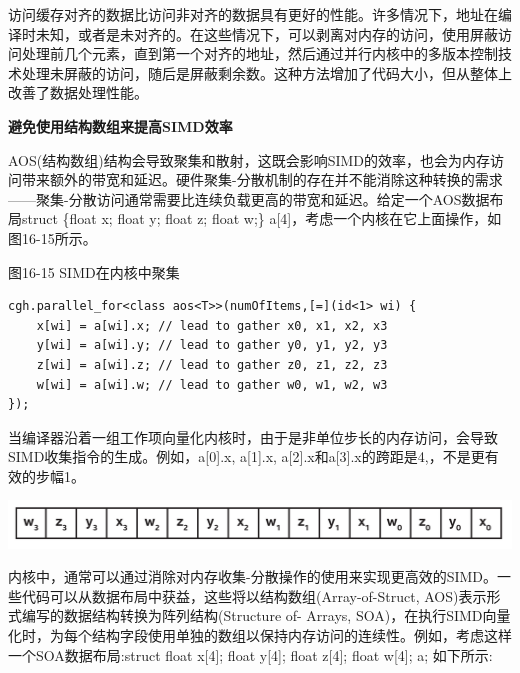 访问缓存对齐的数据比访问非对齐的数据具有更好的性能。许多情况下，地址在编译时未知，或者是未对齐的。在这些情况下，可以剥离对内存的访问，使用屏蔽访问处理前几个元素，直到第一个对齐的地址，然后通过并行内核中的多版本控制技术处理未屏蔽的访问，随后是屏蔽剩余数。这种方法增加了代码大小，但从整体上改善了数据处理性能。\par

\hspace*{\fill} \par %
\textbf{避免使用结构数组来提高SIMD效率}

AOS(结构数组)结构会导致聚集和散射，这既会影响SIMD的效率，也会为内存访问带来额外的带宽和延迟。硬件聚集-分散机制的存在并不能消除这种转换的需求——聚集-分散访问通常需要比连续负载更高的带宽和延迟。给定一个AOS数据布局struct \{float x; float y; float z; float w;\} a[4]，考虑一个内核在它上面操作，如图16-15所示。\par

\hspace*{\fill} \par %
图16-15 SIMD在内核中聚集
\begin{lstlisting}[caption={}]
cgh.parallel_for<class aos<T>>(numOfItems,[=](id<1> wi) {
	x[wi] = a[wi].x; // lead to gather x0, x1, x2, x3
	y[wi] = a[wi].y; // lead to gather y0, y1, y2, y3
	z[wi] = a[wi].z; // lead to gather z0, z1, z2, z3 
	w[wi] = a[wi].w; // lead to gather w0, w1, w2, w3
});
\end{lstlisting}

当编译器沿着一组工作项向量化内核时，由于是非单位步长的内存访问，会导致SIMD收集指令的生成。例如，a[0].x, a[1].x, a[2].x和a[3].x的跨距是4,，不是更有效的步幅1。\par

\begin{center}
	\includegraphics[width=1.0\textwidth]{content/chapter-16/images/8}
\end{center}

内核中，通常可以通过消除对内存收集-分散操作的使用来实现更高效的SIMD。一些代码可以从数据布局中获益，这些将以结构数组(Array-of-Struct, AOS)表示形式编写的数据结构转换为阵列结构(Structure of- Arrays, SOA)，在执行SIMD向量化时，为每个结构字段使用单独的数组以保持内存访问的连续性。例如，考虑这样一个SOA数据布局:struct {float x[4]; float 	y[4]; float z[4]; float w[4];} a; 如下所示:\par

